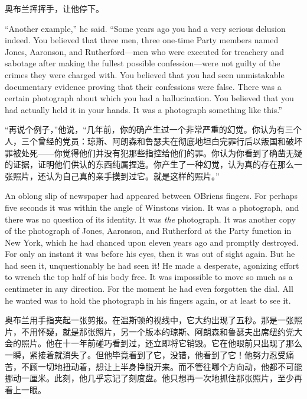 \begin{paracol}{2}
奥布兰挥挥手，让他停下。

\switchcolumn*

``Another example,'' he said. ``Some years ago you had a very serious
delusion indeed. You believed that three men, three one-time Party
members named Jones, Aaronson, and Rutherford---men who were executed
for treachery and sabotage after making the fullest possible
confession---were not guilty of the crimes they were charged with. You
believed that you had seen unmistakable documentary evidence proving
that their confessions were false. There was a certain photograph about
which you had a hallucination. You believed that you had actually held
it in your hands. It was a photograph something like this.''

\switchcolumn

``再说个例子，''他说，``几年前，你的确产生过一个非常严重的幻觉。你认为有三个人，三个曾经的党员：琼斯、阿朗森和鲁瑟夫在彻底地坦白完罪行后以叛国和破坏罪被处死——你觉得他们并没有犯那些指控给他们的罪。你认为你看到了确凿无疑的证据，证明他们供认的东西纯属捏造。你产生了一种幻觉，认为真的存在那么一张照片，还认为自己真的亲手摸到过它。就是这样的照片。''

\switchcolumn*

An oblong slip of newspaper had appeared between
O\textquotesingle Brien\textquotesingle s fingers. For perhaps five
seconds it was within the angle of Winston\textquotesingle s vision. It
was a photograph, and there was no question of its identity. It was
\emph{the} photograph. It was another copy of the photograph of Jones,
Aaronson, and Rutherford at the Party function in New York, which he had
chanced upon eleven years ago and promptly destroyed. For only an
instant it was before his eyes, then it was out of sight again. But he
had seen it, unquestionably he had seen it! He made a desperate,
agonizing effort to wrench the top half of his body free. It was
impossible to move so much as a centimeter in any direction. For the
moment he had even forgotten the dial. All he wanted was to hold the
photograph in his fingers again, or at least to see it.

\switchcolumn

奥布兰用手指夹起一张剪报。在温斯顿的视线中，它大约出现了五秒。那是一张照片，不用怀疑，就是那张照片，另一个版本的琼斯、阿朗森和鲁瑟夫出席纽约党大会的照片。他在十一年前碰巧看到过，还立即将它销毁。它在他眼前只出现了那么一瞬，紧接着就消失了。但他毕竟看到了它，没错，他看到了它！他努力忍受痛苦，不顾一切地扭动着，想让上半身挣脱开来。而不管往哪个方向动，他都不可能挪动一厘米。此刻，他几乎忘记了刻度盘。他只想再一次地抓住那张照片，至少再看上一眼。


\end{paracol}
